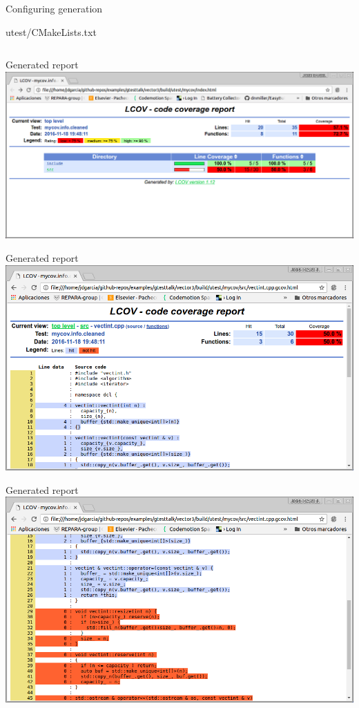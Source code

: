 \begin{frame}[t,fragile]{Configuring generation}
\begin{block}{utest/CMakeLists.txt}\tiny
\inputminted[firstline=23]{cmake}{examples/vector3/utest/CMakeLists.txt}
\end{block}
\end{frame}

\begin{frame}[t]{Generated report}
\includegraphics[width=\textwidth]{img/lcov1.png}
\end{frame}

\begin{frame}[t]{Generated report}
\includegraphics[width=\textwidth]{img/lcov2.png}
\end{frame}

\begin{frame}[t]{Generated report}
\includegraphics[width=\textwidth]{img/lcov3.png}
\end{frame}
